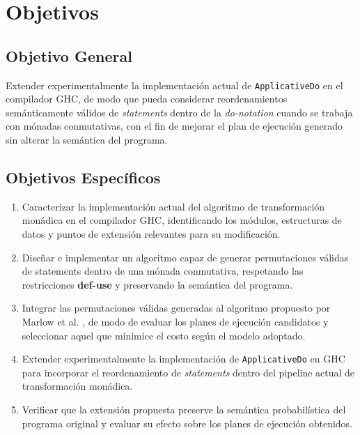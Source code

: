 \section{Objetivos}\label{chap:obj}

\subsection*{Objetivo General}\label{sec:obj-g}

Extender experimentalmente la implementación actual de \texttt{ApplicativeDo} en el compilador \textsf{GHC}, de modo que pueda considerar reordenamientos semánticamente válidos de 	\textit{statements} dentro de la \textit{do-notation} cuando se trabaja con mónadas conmutativas, con el fin de mejorar el plan de ejecución generado sin alterar la semántica del programa.

\subsection*{Objetivos Específicos}\label{sec:obj-e}

\begin{enumerate}
    \item Caracterizar la implementación actual del algoritmo de transformación monádica en el compilador \textsf{GHC}, identificando los módulos, estructuras de datos y puntos de extensión relevantes para su modificación.
    
    \item Diseñar e implementar un algoritmo capaz de generar permutaciones válidas de \textit{}{statements} dentro de una mónada conmutativa, respetando las restricciones \textbf{def-use} y preservando la semántica del programa.
    
    \item Integrar las permutaciones válidas generadas al algoritmo propuesto por Marlow et al. \cite{marlow_ado}, de modo de evaluar los planes de ejecución candidatos y seleccionar aquel que minimice el costo según el modelo adoptado.

    \item Extender experimentalmente la implementación de \texttt{ApplicativeDo} en \textsf{GHC} para incorporar el reordenamiento de 	\textit{statements} dentro del pipeline actual de transformación monádica.

    \item Verificar que la extensión propuesta preserve la semántica probabilística del programa original y evaluar su efecto sobre los planes de ejecución obtenidos.
   
\end{enumerate}

